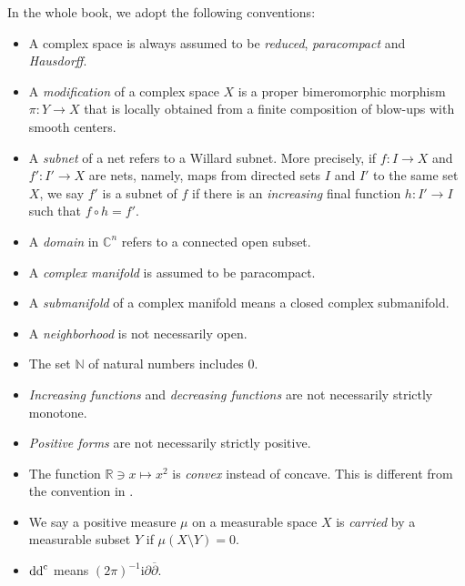 %
%


In the whole book, we adopt the following conventions:
\begin{itemize}
    \item A complex space is always assumed to be \emph{reduced}, \emph{paracompact} and \emph{Hausdorff}.
    \item A \emph{modification} of a complex space $X$ is a proper bimeromorphic morphism $\pi\colon Y\rightarrow X$ that is locally obtained from a finite composition of blow-ups with smooth centers.
    \item A \emph{subnet} of a net refers to a Willard subnet. More precisely, if $f\colon I\rightarrow X$ and $f'\colon I'\rightarrow X$ are nets, namely, maps from directed sets $I$ and $I'$ to the same set $X$, we say $f'$ is a subnet of $f$ if there is an \emph{increasing} final function $h\colon I'\rightarrow I$ such that $f\circ h=f'$.
    \item A \emph{domain} in $\mathbb{C}^n$ refers to a connected open subset.
    \item A \emph{complex manifold} is assumed to be paracompact.
    \item A \emph{submanifold} of a complex manifold means a closed complex submanifold.
    \item A \emph{neighborhood} is not necessarily open.
    \item The set $\mathbb{N}$ of natural numbers includes $0$.
    \item \emph{Increasing functions} and \emph{decreasing functions} are not necessarily strictly monotone.
    \item \emph{Positive forms} are not necessarily strictly positive.
    \item The function $\mathbb{R}\ni x \mapsto x^2$ is \emph{convex} instead of concave. This is different from the convention in \cite{CLS11}.
    \item We say a positive measure $\mu$ on a measurable space $X$ is \emph{carried} by a measurable subset $Y$ if $\mu(X\setminus Y)=0$.
    \item $\mathrm{dd}^{\mathrm{c}}$ means $(2\pi)^{-1}\mathrm{i}\partial \overline{\partial}$.
\end{itemize}

